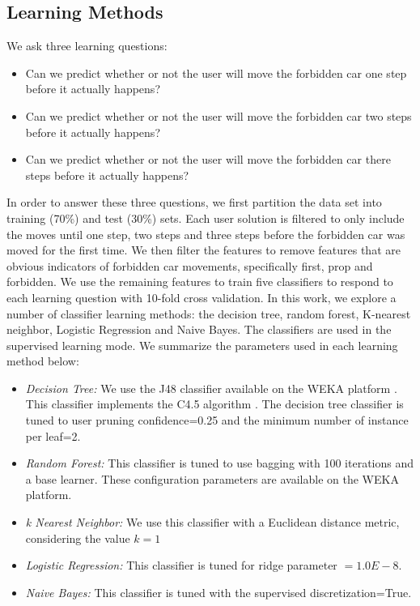 \subsection*{Learning Methods}
We ask three learning questions:
\begin{itemize}
\item Can we predict whether or not the user will move the forbidden car one step before it actually happens?
\item Can we predict whether or not the user will move the forbidden car two steps before it actually happens?
\item Can we predict whether or not the user will move the forbidden car there steps before it actually happens?
\end{itemize}

In order to answer these three questions, we first partition the data set into training (70\%) and test (30\%) sets. Each user solution is filtered to only include the moves until one step, two steps and three steps before the forbidden car was moved for the first time. We then filter the features to remove features that are obvious indicators of forbidden car movements, specifically first, prop and forbidden. We use the remaining features to train five classifiers to respond to each learning question with 10-fold cross validation. In this work, we explore a number of classifier learning methods: the decision tree, random forest, K-nearest neighbor, Logistic Regression and Naive Bayes. The classifiers are used in the supervised learning mode. We summarize the parameters used in each learning method below:
\begin{itemize}
\item \textit{Decision Tree:} We use the J48 classifier available on the WEKA platform \cite{hall09}. This classifier implements the C4.5 algorithm \cite{quinlan1993c45}. The decision tree classifier is tuned to user pruning confidence=0.25 and the minimum number of instance per leaf=2.
\item \textit{Random Forest:} This classifier is tuned to use bagging with 100 iterations and a base learner. These configuration parameters are available on the WEKA platform. 
\item \textit{k Nearest Neighbor:} We use this classifier with a Euclidean distance metric, considering the value $k=1$
\item \textit{Logistic Regression:} This classifier is tuned for ridge parameter $= 1.0E-8$.
\item \textit{Naive Bayes:} This classifier is tuned with the supervised discretization=True.
\end{itemize}

